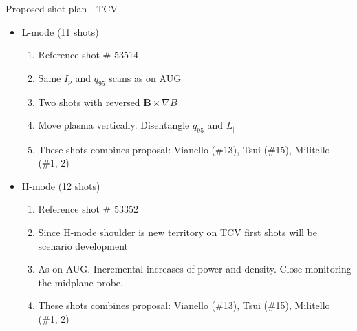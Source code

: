 \documentclass[10pt, compress]{beamer}
\begin{document}
\begin{frame}{Proposed shot plan - TCV}
	\begin{itemize}
		\item L-mode (11 shots)
		\begin{enumerate}
			\item Reference shot \# 53514
			\item Same $I_p$ and $q_{95}$ scans as on AUG
			\item Two shots with reversed $\bm{B} \times \nabla B$
			\item Move plasma vertically. Disentangle
                          $q_{95}$ and $L_{\|}$	
                        \item These shots combines proposal: Vianello
                          (\#13), Tsui (\#15), Militello (\#1, 2)
		\end{enumerate}
		\item H-mode (12 shots)
		\begin{enumerate}
			\item Reference shot \# 53352
			\item Since H-mode shoulder is new territory on TCV first shots will be scenario development
			\item As on AUG. Incremental increases of power and density. Close monitoring the midplane probe. 
                        \item These shots combines proposal: Vianello
                          (\#13), Tsui (\#15), Militello (\#1, 2)
		\end{enumerate}
	\end{itemize}
\end{frame}
\end{document}
